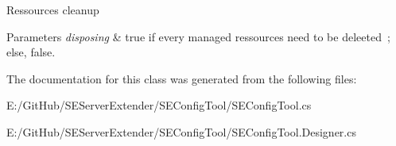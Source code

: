 Ressources cleanup 


\begin{DoxyParams}{Parameters}
{\em disposing} & true if every managed ressources need to be deleeted ; else, false.\\
\hline
\end{DoxyParams}


The documentation for this class was generated from the following files\+:\begin{DoxyCompactItemize}
\item 
E\+:/\+Git\+Hub/\+S\+E\+Server\+Extender/\+S\+E\+Config\+Tool/S\+E\+Config\+Tool.\+cs\item 
E\+:/\+Git\+Hub/\+S\+E\+Server\+Extender/\+S\+E\+Config\+Tool/S\+E\+Config\+Tool.\+Designer.\+cs\end{DoxyCompactItemize}
